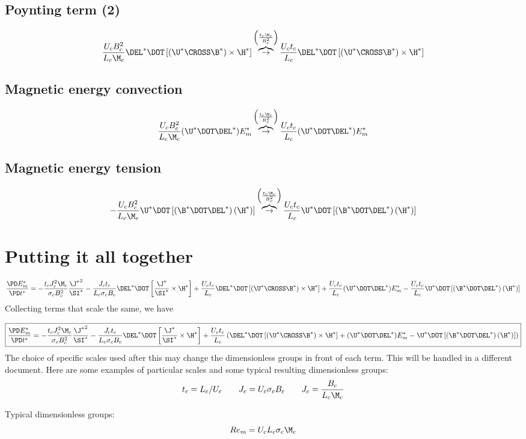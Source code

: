 \documentclass[11pt]{article}
\newcommand{\OB}{\overbrace{\rightarrow}^{\left(\frac{t_c \M_c}{B_c^2}\right)}}
\begin{document}
\subsection{Poynting term (2)}
\begin{equation}
	\frac{U_c B_c^2}{L_c \M_c} \DEL^* \DOT \left[\left(\U^* \CROSS \B^* \right) \times \H^* \right]
	\OB
	\frac{U_c t_c}{L_c} \DEL^* \DOT \left[\left(\U^* \CROSS \B^* \right) \times \H^* \right]
\end{equation}
\subsection{Magnetic energy convection}
\begin{equation}
	\frac{U_c B_c^2}{L_c \M_c} (\U^* \DOT \DEL^*) E_m^*
	\OB
	\frac{U_c t_c}{L_c} (\U^* \DOT \DEL^*) E_m^*
\end{equation}
\subsection{Magnetic energy tension}
\begin{equation}
	- \frac{U_c B_c^2}{L_c \M_c} \U^* \DOT \left[(\B^* \DOT \DEL^*) \left( \H^* \right) \right]
	\OB
	\frac{U_c t_c}{L_c} \U^* \DOT \left[(\B^* \DOT \DEL^*) \left( \H^* \right) \right]
\end{equation}
\section{Putting it all together}
\begin{equation}
	\frac{\PD E_m^*}{\PD t^*} =
	- \frac{t_c J_c^2 \M_c}{\sigma_c B_c^2} \frac{{\J^*}^2}{\SI^*}
	- \frac{J_c t_c}{L_c \sigma_c B_c} \DEL^* \DOT \left[\frac{\J^*}{\SI^*} \times \H^* \right]
	+ \frac{U_c t_c}{L_c} \DEL^* \DOT \left[\left(\U^* \CROSS \B^* \right) \times \H^* \right]
	+ \frac{U_c t_c}{L_c} (\U^* \DOT \DEL^*) E_m^*
	- \frac{U_c t_c}{L_c} \U^* \DOT \left[(\B^* \DOT \DEL^*) \left( \H^* \right) \right]
\end{equation}
Collecting terms that scale the same, we have

\begin{equation}
	\boxed{
	\frac{\PD E_m^*}{\PD t^*} =
	- \frac{t_c J_c^2 \M_c}{\sigma_c B_c^2} \frac{{\J^*}^2}{\SI^*}
	- \frac{J_c t_c}{L_c \sigma_c B_c} \DEL^* \DOT \left[\frac{\J^*}{\SI^*} \times \H^* \right]
	+ \frac{U_c t_c}{L_c} \left(
	\DEL^* \DOT \left[\left(\U^* \CROSS \B^* \right) \times \H^* \right]
	+ (\U^* \DOT \DEL^*) E_m^*
	- \U^* \DOT \left[(\B^* \DOT \DEL^*) \left( \H^* \right) \right]
	\right)
	}
\end{equation}
The choice of specific scales used after this may change the dimensionless groups in front of each term. This will be handled in a different document. Here are some examples of particular scales and some typical resulting dimensionless groups:
\begin{equation}\begin{aligned}
	t_c = L_c/ U_c \qquad
	J_c = U_c \sigma_c B_c \qquad
	J_c = \frac{B_c}{L_c \M_c}
\end{aligned}\end{equation}

Typical dimensionless groups:
\begin{equation}
	Re_m = U_c L_c \sigma_c \M_c
\end{equation}
\end{document}
